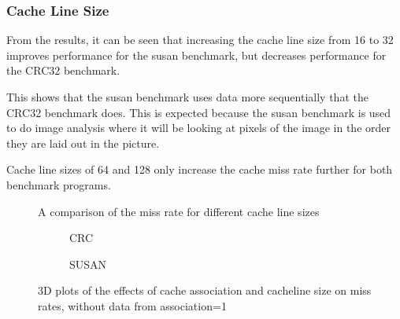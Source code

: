 \subsubsection{Cache Line Size}

From the results, it can be seen that increasing the cache line size from 16 to 32 
improves performance for the susan benchmark, but decreases performance for the CRC32 
benchmark. 

This shows that the susan benchmark uses data more sequentially that the CRC32 benchmark 
does.
This is expected because the susan benchmark is used to do image analysis where it will be 
looking at pixels of the image in the order they are laid out in the picture.

Cache line sizes of 64 and 128 only increase the cache miss rate further for 
both benchmark programs.

\begin{figure}[H]
    \centering
    
    \caption{A comparison of the miss rate for different cache line sizes}
    \label{fig:partb-cacheln}
\end{figure}

\begin{figure}[H]
\begin{subfigure}{.5\textwidth}
    \centering
    
    \caption{CRC}
    \label{fig:partb-2d-crc}
\end{subfigure}
\begin{subfigure}{.5\textwidth}
    \centering
    
    \caption{SUSAN}
    \label{fig:partb-2d-susan}
\end{subfigure}
\caption{3D plots of the effects of cache association and cacheline size on miss rates, without data from association=1}
\end{figure}
